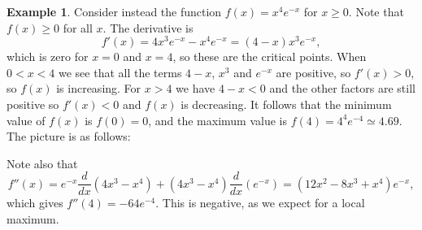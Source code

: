 \documentclass[reqno]{amsart}
\theoremstyle{definition}
\newtheorem{example}[theorem]{Example}
\begin{document}
\begin{example}
 Consider instead the function $f(x)=x^4e^{-x}$ for $x\geq 0$.
 Note that $f(x)\geq 0$ for all $x$.  The derivative is 
 \[ f'(x) = 4x^3e^{-x}- x^4e^{-x} = (4-x)x^3e^{-x}, \]
 which is zero for $x=0$ and $x=4$, so these are the critical
 points.  When $0<x<4$ we see that all the terms $4-x$,
 $x^3$ and $e^{-x}$ are positive, so $f'(x)>0$, so $f(x)$ is
 increasing.  For $x>4$ we have $4-x<0$ and the other factors are
 still positive so $f'(x)<0$ and $f(x)$ is decreasing.  It follows
 that the minimum value of $f(x)$ is $f(0)=0$, and the maximum value
 is $f(4)=4^{4}e^{-4}\simeq 4.69$.  The picture is as
 follows:  
 \begin{center}
 \end{center} 
 Note also that 
 \[ f''(x) =
     e^{-x} \frac{d}{dx}(4x^3-x^4) + (4x^3-x^4)\frac{d}{dx}(e^{-x}) = 
      (12x^2-8x^3+x^4) e^{-x},
 \]
 which gives $f''(4)=-64e^{-4}$.  This is negative, as we expect for a
 local maximum. 
\end{example}
\end{document}
